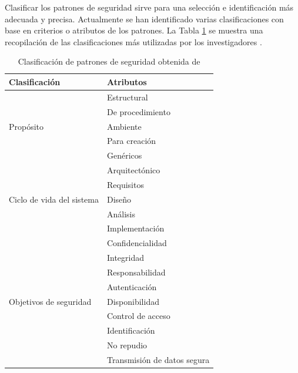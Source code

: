 Clasificar los patrones de seguridad sirve para una selección e identificación más adecuada y precisa. Actualmente se han identificado varias clasificaciones con base en criterios o atributos de los patrones. La Tabla \ref{clasiPatrones} se muestra una recopilación de las clasificaciones más utilizadas por los investigadores \cite{PonShiKre16}.
\begin{table}[!tb]
\scriptsize
\begin{center}
\begin{tabular}{ |m{3.5cm}|m{4cm}|}
\hline
\cellcolor{lightgray}\textbf{Clasificación} &\cellcolor{lightgray} \textbf{Atributos} \\
\hline
 
 \multirow{5}{*}{Propósito} &  Estructural \\ \cline{2-2}
 &  De procedimiento \\ \cline{2-2}
 & Ambiente \\ \cline{2-2}
 & Para creación\\ \cline{2-2}
 & Genéricos \\ \hline

 
 \multirow{5}{*}{Ciclo de vida del sistema} &  Arquitectónico \\ \cline{2-2}
 &  Requisitos \\ \cline{2-2}
 & Diseño \\ \cline{2-2}
 & Análisis \\ \cline{2-2}
 & Implementación \\ \hline

\multirow{9}{*}{Objetivos de seguridad} &  Confidencialidad \\ \cline{2-2}
 &  Integridad \\ \cline{2-2}
 & Responsabilidad \\ \cline{2-2}
 & Autenticación \\ \cline{2-2}
 & Disponibilidad \\ \cline{2-2}
 & Control de acceso \\ \cline{2-2}
 & Identificación \\ \cline{2-2}
 & No repudio \\ \cline{2-2}
 & Transmisión de datos segura\\ \hline
\end{tabular}
\caption{Clasificación de patrones de seguridad obtenida de \cite{PonShiKre16}}
\label{clasiPatrones}
\end{center}
\end{table}

\normalsize

